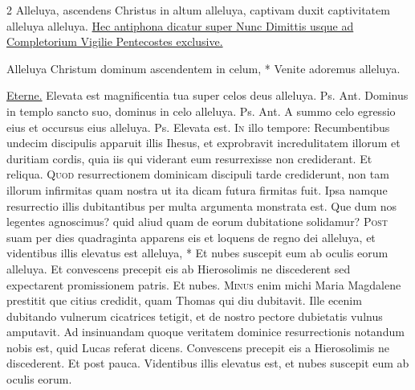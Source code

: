 \begin{multicols*}{2}
 Alleluya, ascendens Christus in altum alleluya, captivam duxit captivitatem alleluya alleluya.
\newline \ul{Hec antiphona dicatur super Nunc Dimittis usque ad Completorium Vigilie Pentecostes exclusive.}
{\color{Red} }
\begin{invitatory}
{Alleluya Christum dominum ascendentem in celum, * Venite adoremus alleluya.}
\end{invitatory}
 \hyperlink{eterne-rex-altissime}{Eterne.}
 Elevata est magnificentia tua super celos deus alleluya. {\color{Red} Ps.}  {\color{Red} Ant.} Dominus in templo sancto suo, dominus in celo alleluya. {\color{Red} Ps.}  {\color{Red} Ant.} A summo celo egressio eius et occursus eius alleluya. %
{\color{Red} Ps.}  \V Elevata est.
\lettrine[lines=2]{\zallmancaps \color{Red} I}{n} illo tempore: Recumbentibus undecim discipulis apparuit illis Ihesus, et exprobravit incredulitatem illorum et duritiam cordis, quia iis qui viderant eum resurrexisse non crediderant. Et reliqua.
\lettrine[lines=2]{\zallmancaps \color{Blue} Q}{uod} resurrectionem dominicam discipuli tarde crediderunt, non tam illorum infirmitas quam nostra ut ita dicam futura firmitas fuit. Ipsa namque resurrectio illis dubitantibus per multa argumenta monstrata est. Que dum nos legentes agnoscimus? quid aliud quam de eorum dubitatione solidamur?
\lettrine[lines=2]{\zallmancaps \color{Red} P}{ost} \hypertarget{post-passionem}{\label{post-passionem}} suam per dies quadraginta apparens eis et loquens de regno dei alleluya, et videntibus illis elevatus est alleluya, * Et nubes suscepit eum ab oculis eorum alleluya. \V Et convescens precepit eis ab Hierosolimis ne discederent sed expectarent promissionem patris. Et nubes.
\lettrine[lines=2]{\zallmancaps \color{Blue} M}{inus} enim michi Maria Magdalene prestitit que citius credidit, quam Thomas qui diu dubitavit. Ille ecenim dubitando vulnerum cicatrices tetigit, et de nostro pectore dubietatis vulnus amputavit. Ad insinuandam quoque veritatem dominice resurrectionis notandum nobis est, quid Lucas referat dicens. Convescens precepit eis a Hierosolimis ne discederent. Et post pauca. Videntibus illis elevatus est, et nubes suscepit eum ab oculis eorum.

\end{multicols*}
